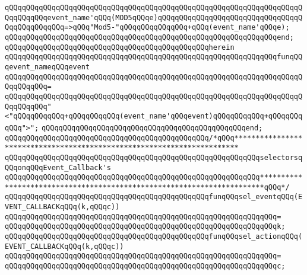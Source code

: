 \verb|qQQqqQQqqQQqqQQqqQQqqQQqqQQqqQQqqQQqqQQqqQQqqQQqqQQqqQQqqQQqqQQqqQQqqQQqqQQqqQQqevent_name'qQQq(MOD5qQQqe)qQQqqQQqqQQqqQQqqQQqqQQqqQQqqQQqqQQqqQQqqQQqqQQq=>qQQq"Mod5-"qQQqqQQqqQQqqQQq+qQQq(event_name'qQQqe);|\newline
\verb|qQQqqQQqqQQqqQQqqQQqqQQqqQQqqQQqqQQqqQQqqQQqqQQqqQQqqQQqqQQqqQQqend;|\newline
\verb|qQQqqQQqqQQqqQQqqQQqqQQqqQQqqQQqqQQqqQQqqQQqqQQqherein|\newline
\verb|qQQqqQQqqQQqqQQqqQQqqQQqqQQqqQQqqQQqqQQqqQQqqQQqqQQqqQQqqQQqqQQqfunqQQqevent_nameqQQqevent|\newline
\verb|qQQqqQQqqQQqqQQqqQQqqQQqqQQqqQQqqQQqqQQqqQQqqQQqqQQqqQQqqQQqqQQqqQQqqQQqqQQqqQQq=|\newline
\verb|qQQqqQQqqQQqqQQqqQQqqQQqqQQqqQQqqQQqqQQqqQQqqQQqqQQqqQQqqQQqqQQqqQQqqQQqqQQqqQQq"<"qQQqqQQqqQQq+qQQqqQQqqQQq(event_name'qQQqevent)qQQqqQQqqQQq+qQQqqQQqqQQq">";|\newline
\verb|qQQqqQQqqQQqqQQqqQQqqQQqqQQqqQQqqQQqqQQqqQQqqQQqend;|\newline
\newline
\verb|qQQqqQQqqQQqqQQqqQQqqQQqqQQqqQQqqQQqqQQqqQQqqQQq/*qQQq***********************************************************************|\newline
\newline
\verb|qQQqqQQqqQQqqQQqqQQqqQQqqQQqqQQqqQQqqQQqqQQqqQQqqQQqqQQqqQQqselectorsqQQqonqQQqEvent_Callback's|\newline
\newline
\verb|qQQqqQQqqQQqqQQqqQQqqQQqqQQqqQQqqQQqqQQqqQQqqQQqqQQqqQQqqQQq***********************************************************************qQQq*/|\newline
\newline
\newline
\verb|qQQqqQQqqQQqqQQqqQQqqQQqqQQqqQQqqQQqqQQqqQQqqQQqfunqQQqsel_eventqQQq(EVENT_CALLBACKqQQq(k,qQQqc))|\newline
\verb|qQQqqQQqqQQqqQQqqQQqqQQqqQQqqQQqqQQqqQQqqQQqqQQqqQQqqQQqqQQqqQQq=|\newline
\verb|qQQqqQQqqQQqqQQqqQQqqQQqqQQqqQQqqQQqqQQqqQQqqQQqqQQqqQQqqQQqqQQqk;|\newline
\newline
\verb|qQQqqQQqqQQqqQQqqQQqqQQqqQQqqQQqqQQqqQQqqQQqqQQqfunqQQqsel_actionqQQq(EVENT_CALLBACKqQQq(k,qQQqc))|\newline
\verb|qQQqqQQqqQQqqQQqqQQqqQQqqQQqqQQqqQQqqQQqqQQqqQQqqQQqqQQqqQQqqQQq=|\newline
\verb|qQQqqQQqqQQqqQQqqQQqqQQqqQQqqQQqqQQqqQQqqQQqqQQqqQQqqQQqqQQqqQQqc;|\newline
